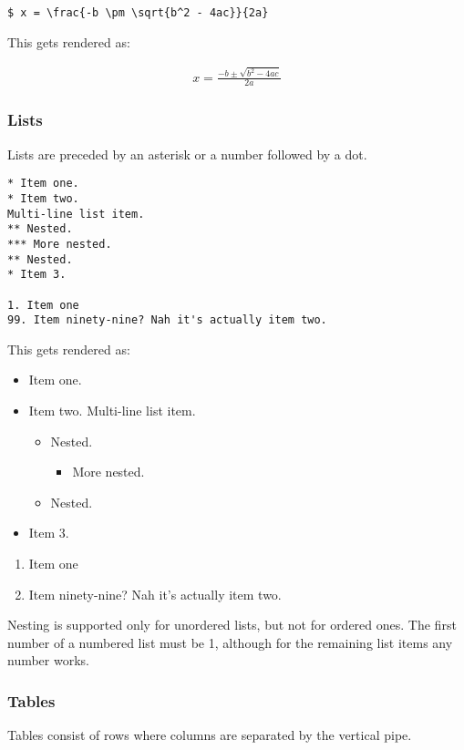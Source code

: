 \begin{lstlisting}
$ x = \frac{-b \pm \sqrt{b^2 - 4ac}}{2a}
\end{lstlisting}
This gets rendered as:

\begin{align}
\label{eq1}
x = \frac{-b \pm \sqrt{b^2 - 4ac}}{2a}\end{align}
\subsubsection{Lists}
\label{s2.3.5}
Lists are preceded by an asterisk or a number followed by a dot.

\begin{lstlisting}
* Item one.
* Item two.
Multi-line list item.
** Nested.
*** More nested.
** Nested.
* Item 3.

1. Item one
99. Item ninety-nine? Nah it's actually item two.
\end{lstlisting}
This gets rendered as:

\begin{itemize}\item Item one.
\item Item two.
Multi-line list item.\begin{itemize}\item Nested.\begin{itemize}\item More nested.
\end{itemize}

\item Nested.
\end{itemize}

\item Item 3.
\end{itemize}
\begin{enumerate}
\item Item one
\item Item ninety-nine? Nah it's actually item two.
\end{enumerate}
Nesting is supported only for unordered lists, but not for ordered ones. The first number of a numbered list must be 1, although for the remaining list items any number works.

\subsubsection{Tables}
\label{s2.3.6}
Tables consist of rows where columns are separated by the vertical pipe.

